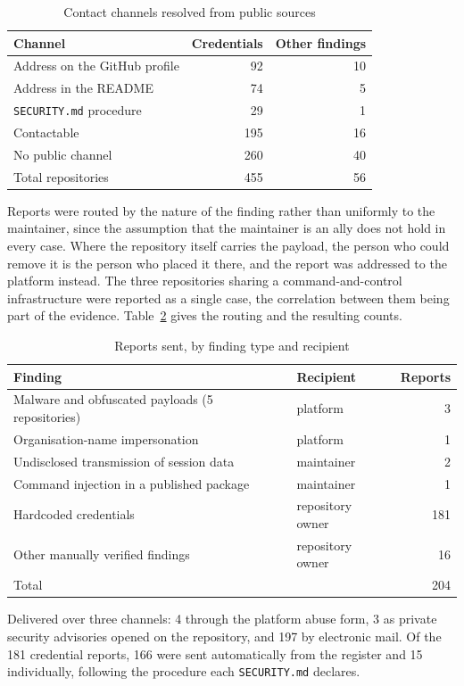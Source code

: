 \begin{table}[htbp]
\centering
\caption{Contact channels resolved from public sources}
\label{tab:long:channels}
\begin{tabular}{lrr}
\toprule
Channel & Credentials & Other findings \\
\midrule
Address on the GitHub profile        & 92  & 10 \\
Address in the README                & 74  & 5 \\
\texttt{SECURITY.md} procedure       & 29  & 1 \\
\midrule
Contactable                          & 195 & 16 \\
No public channel                    & 260 & 40 \\
\midrule
Total repositories                   & 455 & 56 \\
\bottomrule
\end{tabular}
\end{table}

Reports were routed by the nature of the finding rather than uniformly to the
maintainer, since the assumption that the maintainer is an ally does not hold in
every case. Where the repository itself carries the payload, the person who could
remove it is the person who placed it there, and the report was addressed to the
platform instead. The three repositories sharing a command-and-control
infrastructure were reported as a single case, the correlation between them being
part of the evidence.
Table~\ref{tab:long:disclosure} gives the routing and the resulting counts.

\begin{table}[htbp]
\centering
\caption{Reports sent, by finding type and recipient}
\label{tab:long:disclosure}
\begin{tabular}{llr}
\toprule
Finding & Recipient & Reports \\
\midrule
Malware and obfuscated payloads (5 repositories) & platform            & 3 \\
Organisation-name impersonation                  & platform            & 1 \\
Undisclosed transmission of session data         & maintainer          & 2 \\
Command injection in a published package         & maintainer          & 1 \\
Hardcoded credentials                            & repository owner    & 181 \\
Other manually verified findings                 & repository owner    & 16 \\
\midrule
Total                                            &                     & 204 \\
\bottomrule
\end{tabular}

\vspace{2mm}
\footnotesize
Delivered over three channels: 4 through the platform abuse form, 3 as private
security advisories opened on the repository, and 197 by electronic mail. Of the
181 credential reports, 166 were sent automatically from the register and 15
individually, following the procedure each \texttt{SECURITY.md} declares.
\end{table}

